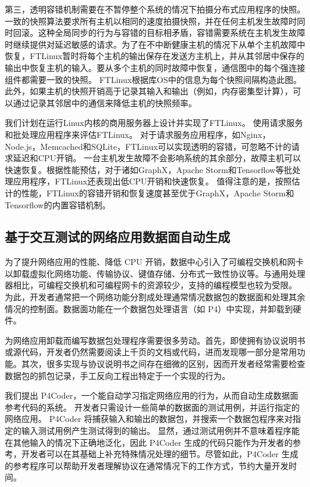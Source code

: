 第三，透明容错机制需要在不暂停整个系统的情况下拍摄分布式应用程序的快照。一致的快照算法要求所有主机以相同的速度拍摄快照，并在任何主机发生故障时同时回滚。这种全局同步的行为与容错的目标相矛盾，容错需要系统在主机发生故障时继续提供对延迟敏感的请求。为了在不中断健康主机的情况下从单个主机故障中恢复，FTLinux暂时将每个主机的输出保存在发送方主机上，并从其邻居中保存的输出中恢复主机的输入。要从多个主机的同时故障中恢复，通信图中的每个强连接组件都需要一致的快照。 FTLinux根据库OS中的信息为每个快照间隔构造此图。此外，如果主机的快照开销高于记录其输入和输出（例如，内存密集型计算），可以通过记录其邻居中的通信来降低主机的快照频率。

我们计划在运行Linux内核的商用服务器上设计并实现了FTLinux。
使用请求服务和批处理应用程序来评估FTLinux。 对于请求服务应用程序，如Nginx，Node.js，Memcached和SQLite，FTLinux可以实现透明的容错，可忽略不计的请求延迟和CPU开销。 一台主机发生故障不会影响系统的其余部分，故障主机可以快速恢复。根据性能预估，对于诸如GraphX，Apache Storm和Tensorflow等批处理应用程序，FTLinux还表现出低CPU开销和快速恢复。 值得注意的是，按照估计的性能，FTLinux的容错开销和恢复速度甚至优于GraphX，Apache Storm和Tensorflow的内置容错机制。


\subsection{基于交互测试的网络应用数据面自动生成}

为了提升网络应用的性能、降低 CPU 开销，数据中心引入了可编程交换机和网卡以卸载虚拟化网络功能、传输协议、键值存储、分布式一致性协议等。与通用处理器相比，可编程交换机和可编程网卡的资源较少，支持的编程模型也较为受限。
为此，开发者通常把一个网络功能分割成处理通常情况数据包的数据面和处理其余情况的控制面。数据面功能在一个数据包处理语言（如 P4）中实现，并卸载到硬件。

为网络应用卸载而编写数据包处理程序需要很多劳动。首先，即使拥有协议说明书或源代码，开发者仍然需要阅读上千页的文档或代码，进而发现哪一部分是常用功能。其次，很多实现与协议说明书之间存在细微的区别，因而开发者经常需要检查数据包的抓包记录，手工反向工程出特定于一个实现的行为。

我们提出 P4Coder，一个能自动学习指定网络应用的行为，从而自动生成数据面参考代码的系统。
开发者只需设计一些简单的数据面的测试用例，并运行指定的网络应用。
P4Coder 将捕获输入和输出的数据包，并搜索一个数据包程序来对指定的输入测试用例产生测试得到的输出。
显然，通过测试用例并不意味着程序能在其他输入的情况下正确地泛化，因此 P4Coder 生成的代码只能作为开发者的参考，开发者可以在其基础上补充特殊情况处理的细节。尽管如此，P4Coder 生成的参考程序可以帮助开发者理解协议在通常情况下的工作方式，节约大量开发时间。

